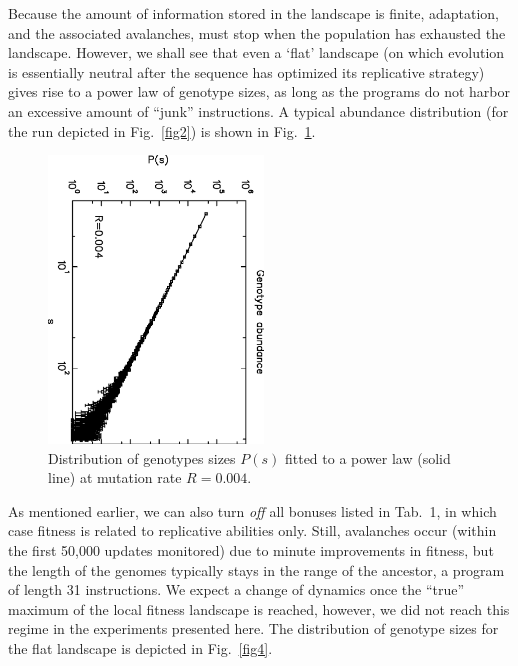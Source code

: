 \documentclass[letterpaper]{article}
\begin{document}
Because the amount of information stored in the landscape is finite,
adaptation, and the associated avalanches, must stop when the
population has exhausted the landscape.  However, we shall see that
even a `flat' landscape (on which evolution is essentially neutral
after the sequence has optimized its replicative strategy) gives rise
to a power law of genotype sizes, as long as the programs do not
harbor an excessive amount of ``junk'' instructions.  A typical
abundance distribution (for the run depicted in Fig.~\ref{fig2}) is
shown in Fig.~\ref{fig3}.


\begin{figure}[ht]
\begin{center}
\includegraphics[width=2.25in, angle=90]{fig3.eps}
\caption{Distribution of genotypes sizes $P(s)$ fitted to a power law
  (solid line) at mutation rate $R=0.004$.}
\label{fig3}
\end{center}
\end{figure}


As mentioned earlier, we can also turn {\em off} all bonuses listed in
Tab.~1, in which case fitness is related to replicative abilities
only. Still, avalanches occur (within the first 50,000 updates
monitored) due to minute improvements in fitness, but the length of
the genomes typically stays in the range of the ancestor, a program of
length 31 instructions. We expect a change of dynamics once the
``true'' maximum of the local fitness landscape is reached, however,
we did not reach this regime in the experiments presented here. The
distribution of genotype sizes for the flat landscape is depicted in
Fig.~\ref{fig4}.
\end{document}
